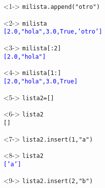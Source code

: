 \documentclass[12pt]{beamer}
\begin{document}
\begin{frame}[fragile]
\fontsize{10}{10}\selectfont
\begin{minipage}{5.5cm}
\begin{exampleblock}{}<1->
	\verb|milista.append("otro")| \\
\end{exampleblock}
\begin{exampleblock}{}<2->
	\verb|milista| \\
	\pause
	\textcolor{blue}{\texttt{[2.0,"hola",3.0,True,'otro']}}
\end{exampleblock}
\begin{exampleblock}{}<3->
	\verb|milista[:2]| \\
	\pause
	\textcolor{blue}{\texttt{[2.0,"hola"]}}
\end{exampleblock}
\begin{exampleblock}{}<4->
	\verb|milista[1:]| \\
	\pause
	\textcolor{blue}{\texttt{[2.0,"hola",3.0,True]}}
\end{exampleblock}
\begin{exampleblock}{}<5->
	\verb|lista2=[]|
\end{exampleblock}
\end{minipage}
\hspace{0.5cm}
\begin{minipage}{5.5cm}
\begin{exampleblock}{}<6->
	\verb|lista2| \\
	\pause
	\verb|[]|
\end{exampleblock}
\begin{exampleblock}{}<7->
	\verb|lista2.insert(1,"a")|
\end{exampleblock}
\begin{exampleblock}{}<8->
	\verb|lista2| \\
	\pause
	\textcolor{blue}{\texttt{['a']}}
\end{exampleblock}
\begin{exampleblock}{}<9->
	\verb|lista2.insert(2,"b")|
\end{exampleblock}
\end{minipage}
\end{frame}
\end{document}
